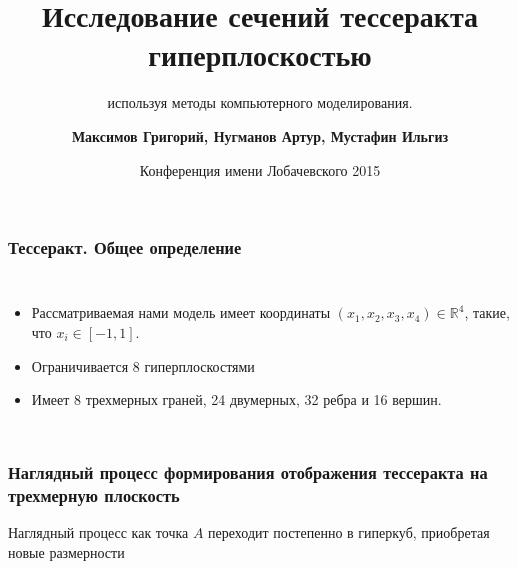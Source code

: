 \documentclass[10pt,pdf,hyperref={unicode}]{beamer}
\title[Исследование сечений тессеракта трехмерной гиперплоскостью с использованием методов компьютерного моделирования] %
{ \bfseries Исследование сечений тессеракта гиперплоскостью}
\subtitle{используя методы компьютерного моделирования.}
\author[Максимов Г., Нугманов А., Мустафин И.]
{ \bfseries Максимов Григорий, Нугманов Артур, Мустафин Ильгиз}
\institute[]{
	\vspace{0.2cm}
	{\bfseries Научный руководитель - Давлетбаев Марсель Фанилевич} \\
	\vspace{0.2cm}

  { \normalsize МАОУ "Лицей-интернат №2"} \\
  Московского района города Казани
}
\date[2015-03-26] %
{Конференция имени Лобачевского 2015}
\begin{document}
\frame{\titlepage}

\begin{frame}
\frametitle{Тессеракт. Общее определение}

\begin{columns}
	{\small
	\begin{itemize}
		\item Рассматриваемая нами модель имеет координаты $(x_1,x_2,x_3,x_4) \in \mathbb{R}^4$, такие, что $x_i \in [ -1,1 ]$. 
		\item Ограничивается 8 гиперплоскостями	
		\item Имеет 8 трехмерных граней, 24 двумерных, 32 ребра и 16 вершин.
	\end{itemize}
}
	\clearpage
\end{columns}

\end{frame}
\begin{frame}
\frametitle{Наглядный процесс формирования отображения тессеракта на трехмерную плоскость}
\begin{center}
\end{center} 

Наглядный процесс как точка $A$ переходит постепенно в гиперкуб, приобретая новые размерности
\end{frame}
\end{document}
